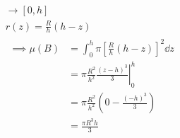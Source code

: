 \begin{bsp*}[note = Kegel]
	\begin{gather*}
		[ a , b ] \rightarrow [ 0 , h ] \\
		r(z) = \frac{R}{h} (h-z) \\
		\begin{split}
			\implies \mu(B)
				&= \int_0^h \pi \left[ \frac{R}{h} (h-z) \right]^2 \dd z \\
				&= \left. \pi \frac{R^2}{h^2} \frac{(z-h)^3}{3} \right|_0^h \\
				&= \pi \frac{R^2}{h^2} \left( 0 - \frac{(-h)^3}{3} \right) \\
				&= \frac{\pi R^3 h}{3}
		\end{split}
	\end{gather*}
\end{bsp*}

